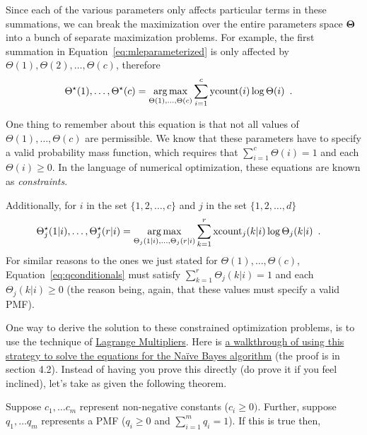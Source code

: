 \documentclass[assignment04_Solutions]{subfiles}
\begin{document}
\begin{exercise}[(60 minutes)]
Since each of the various parameters only affects particular terms in these summations, we can break the maximization over the entire parameters space $\mathbf{\Theta}$ into a bunch of separate maximization problems.  For example, the first summation in Equation~\ref{eq:mleparameterized} is only affected by $\Theta(1), \Theta(2), \ldots, \Theta(c)$, therefore
\begin{align}
\Theta^\star(1), \ldots, \Theta^\star(c)&= \operatorname*{arg\,max}_{\Theta(1), \ldots, \Theta(c)}\sum_{i=1}^c \mbox{ycount}(i) \log \Theta(i) \enspace . \label{eq:qmarginals}
\end{align}

One thing to remember about this equation is that not all values of $\Theta(1), \ldots, \Theta(c)$ are permissible.  We know that these parameters have to specify a valid probability mass function, which requires that $\sum_{i=1}^c \Theta(i) = 1$ and each $\Theta(i) \geq 0$. In the language of numerical optimization, these equations are known as \emph{constraints}.

Additionally, for $i$ in the set $\{1, 2, \ldots, c\}$ and $j$ in the set $\{1, 2, \ldots, d\}$
\begin{align}
\Theta_j^\star(1|i), \ldots, \Theta^\star_j(r|i) &= \operatorname*{arg\,max}_{\Theta_j(1|i), \ldots, \Theta_j(r|i)}\sum_{k=1}^r \mbox{xcount}_j(k|i) \log \Theta_j(k|i) \enspace . \label{eq:qconditionals}
\end{align}
For similar reasons to the ones we just stated for  $\Theta(1), \ldots, \Theta(c)$, Equation~\ref{eq:qconditionals} must satisfy $\sum_{k=1}^r \Theta_j(k|i) = 1$  and each $\Theta_j(k|i) \geq 0$ (the reason being, again, that these values must specify a valid PMF).

One way to derive the solution to these constrained optimization problems, is to use the technique of \href{http://tutorial.math.lamar.edu/Classes/CalcIII/LagrangeMultipliers.aspx}{Lagrange Multipliers}.  Here is \href{http://www.cs.columbia.edu/~mcollins/em.pdf}{a walkthrough of using this strategy to solve the equations for the Na\"ive Bayes algorithm} (the proof is in section 4.2).  Instead of having you prove this directly (do prove it if you feel inclined), let's take as given the following theorem.

Suppose $c_1, \ldots c_m$ represent non-negative constants ($c_i \geq 0)$.  Further, suppose $q_1, \ldots q_m$ represents a PMF ($q_i \geq 0$ and $\sum_{i=1}^m q_i = 1$).  If this is true then,


\end{exercise}
\end{document}

